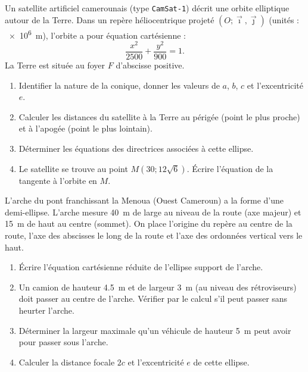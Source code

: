 \documentclass[11pt]{article}
\begin{document}
\begin{exercice}
Un satellite artificiel camerounais (type \texttt{CamSat-1}) décrit une orbite elliptique autour de la Terre. Dans un repère héliocentrique projeté $(O; \vec{\imath}, \vec{\jmath})$ (unités : \SI{e6}{m}), l'orbite a pour équation cartésienne :
\[
\frac{x^2}{2500} + \frac{y^2}{900} = 1.
\]
La Terre est située au foyer $F$ d'abscisse positive.
\begin{enumerate}
    \item Identifier la nature de la conique, donner les valeurs de $a$, $b$, $c$ et l'excentricité $e$.
    \item Calculer les distances du satellite à la Terre au périgée (point le plus proche) et à l'apogée (point le plus lointain).
    \item Déterminer les équations des directrices associées à cette ellipse.
    \item Le satellite se trouve au point $M(30; 12\sqrt{6})$. Écrire l'équation de la tangente à l'orbite en $M$.
\end{enumerate}
\end{exercice}

\begin{exercice}
L'arche du pont franchissant la Menoua (Ouest Cameroun) a la forme d'une demi-ellipse. L'arche mesure \SI{40}{m} de large au niveau de la route (axe majeur) et \SI{15}{m} de haut au centre (sommet). On place l'origine du repère au centre de la route, l'axe des abscisses le long de la route et l'axe des ordonnées vertical vers le haut.
\begin{enumerate}
    \item Écrire l'équation cartésienne réduite de l'ellipse support de l'arche.
    \item Un camion de hauteur \SI{4,5}{m} et de largeur \SI{3}{m} (au niveau des rétroviseurs) doit passer au centre de l'arche. Vérifier par le calcul s'il peut passer sans heurter l'arche.
    \item Déterminer la largeur maximale qu'un véhicule de hauteur \SI{5}{m} peut avoir pour passer sous l'arche.
    \item Calculer la distance focale $2c$ et l'excentricité $e$ de cette ellipse.
\end{enumerate}
\end{exercice}
\end{document}
